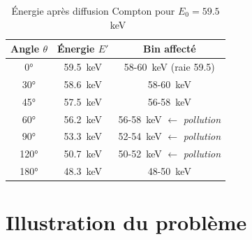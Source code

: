 \documentclass[11pt,a4paper]{article}
\begin{document}
\begin{table}[h!]
\centering
\caption{Énergie après diffusion Compton pour $E_0 = 59.5$~keV}
\label{tab:compton}
\begin{tabular}{ccc}
\toprule
\textbf{Angle $\theta$} & \textbf{Énergie $E'$} & \textbf{Bin affecté} \\
\midrule
0° & 59.5~keV & 58-60~keV (raie 59.5) \\
30° & 58.6~keV & 58-60~keV \\
45° & 57.5~keV & 56-58~keV \\
\rowcolor{colCompton!20} 60° & 56.2~keV & 56-58~keV $\leftarrow$ \textit{pollution} \\
\rowcolor{colCompton!20} 90° & 53.3~keV & 52-54~keV $\leftarrow$ \textit{pollution} \\
\rowcolor{colCompton!20} 120° & 50.7~keV & 50-52~keV $\leftarrow$ \textit{pollution} \\
180° & 48.3~keV & 48-50~keV \\
\bottomrule
\end{tabular}
\end{table}

\section{Illustration du problème}
\end{document}
